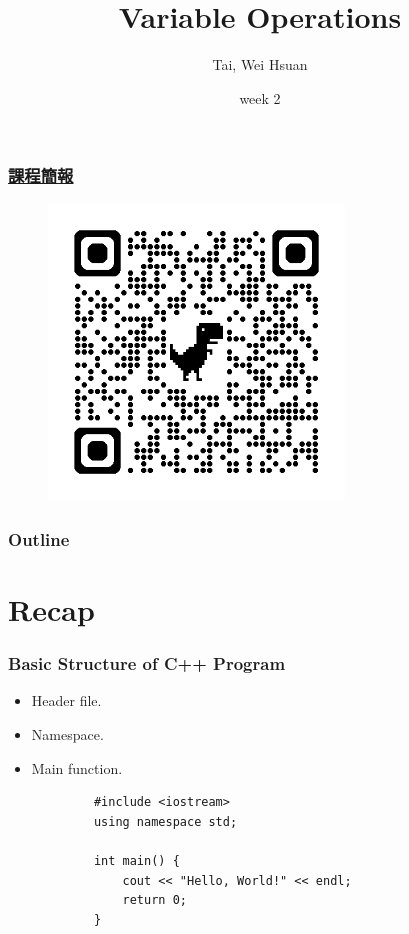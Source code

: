\documentclass[xcolor=dvipsnames]{beamer}
\title{Variable Operations}
\author{Tai, Wei Hsuan}
\date{week 2}
\begin{document}
	\begin{frame}
		\titlepage
	\end{frame}


    \begin{frame}
        \frametitle{\href{https://drive.google.com/drive/folders/14Tkn-rddw0k1obeOxkWi00S43M0e9wlW?usp=sharing}{課程簡報}}
        \begin{figure}
            \centering
            \includegraphics[width=0.7\textwidth]{src/qrcode.png}
        \end{figure}
    \end{frame}

    \begin{frame}
        \frametitle{Outline}
        \tableofcontents
    \end{frame}

    \section{Recap}

    \begin{frame}[fragile]
        \frametitle{Basic Structure of C++ Program}
        \begin{itemize}
            \item Header file.
            \item Namespace.
            \item Main function.
        \end{itemize}
        \begin{verbatim}
            #include <iostream>
            using namespace std;

            int main() {
                cout << "Hello, World!" << endl;
                return 0;
            }
        \end{verbatim}
    \end{frame}
\end{document}
